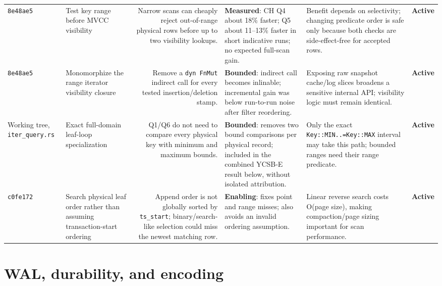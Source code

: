 \documentclass[10pt,a4paper,landscape]{article}
\newcommand{\code}[1]{\texttt{#1}}
\newcommand{\commit}[1]{\code{#1}}
\newcommand{\gainmeasured}{\textbf{Measured}}
\newcommand{\gainbounded}{\textbf{Bounded}}
\newcommand{\gainenabling}{\textbf{Enabling}}
\newcommand{\stateactive}{\textbf{Active}}
\begin{document}
\begin{longtable}{IORGKS}
\commit{8e48ae5} & Test key range before MVCC visibility & Narrow scans can cheaply reject
out-of-range physical rows before up to two visibility lookups. & \gainmeasured: CH Q4 about
18\% faster; Q5 about 11--13\% faster in short indicative runs; no expected full-scan
gain. & Benefit depends on selectivity; changing predicate order is safe only because both
checks are side-effect-free for accepted rows. & \stateactive \\

\commit{8e48ae5} & Monomorphize the range iterator visibility closure & Remove a
\code{dyn FnMut} indirect call for every tested insertion/deletion stamp. & \gainbounded:
indirect call becomes inlinable; incremental gain was below run-to-run noise after filter
reordering. & Exposing raw snapshot cache/log slices broadens a sensitive internal API;
visibility logic must remain identical. & \stateactive \\

Working tree, \code{iter\_query.rs} & Exact full-domain leaf-loop specialization & Q1/Q6
do not need to compare every physical key with minimum and maximum bounds. & \gainbounded:
removes two bound comparisons per physical record; included in the combined YCSB-E result
below, without isolated attribution. & Only the exact \code{Key::MIN..=Key::MAX} interval
may take this path; bounded ranges need their range predicate. & \stateactive \\

\commit{c0fe172} & Search physical leaf order rather than assuming transaction-start
ordering & Append order is not globally sorted by \code{ts\_start}; binary/search-like
selection could miss the newest matching row. & \gainenabling: fixes point and range misses;
also avoids an invalid ordering assumption. & Linear reverse search costs O(page size),
making compaction/page sizing important for scan performance. & \stateactive \\
\bottomrule
\end{longtable}

\section{WAL, durability, and encoding}
\end{document}
